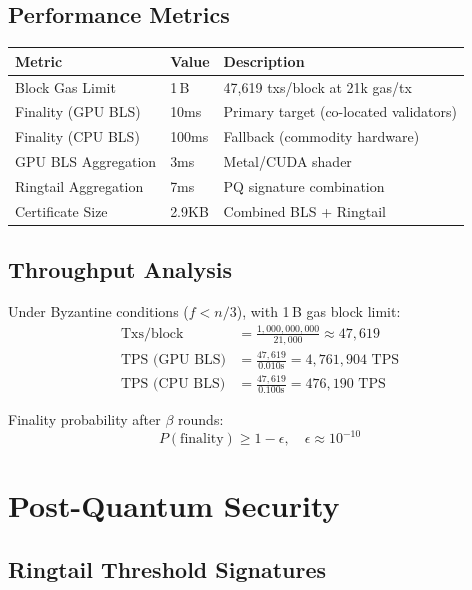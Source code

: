 \documentclass[11pt]{article}
\begin{document}
\subsection{Performance Metrics}

\begin{table}[h]
\centering
\begin{tabular}{@{}lll@{}}
\toprule
\textbf{Metric} & \textbf{Value} & \textbf{Description} \\
\midrule
Block Gas Limit & 1\,B & 47{,}619 txs/block at 21k gas/tx \\
Finality (GPU BLS) & 10ms & Primary target (co-located validators) \\
Finality (CPU BLS) & 100ms & Fallback (commodity hardware) \\
GPU BLS Aggregation & 3ms & Metal/CUDA shader \\
Ringtail Aggregation & 7ms & PQ signature combination \\
Certificate Size & 2.9KB & Combined BLS + Ringtail \\
\bottomrule
\end{tabular}

\label{tab:performance}
\end{table}

\subsection{Throughput Analysis}

Under Byzantine conditions ($f < n/3$), with 1\,B gas block limit:
\begin{align}
\text{Txs/block} &= \frac{1{,}000{,}000{,}000}{21{,}000} \approx 47{,}619 \\
\text{TPS (GPU BLS)} &= \frac{47{,}619}{0.010\text{s}} = 4{,}761{,}904 \text{ TPS} \\
\text{TPS (CPU BLS)} &= \frac{47{,}619}{0.100\text{s}} = 476{,}190 \text{ TPS}
\end{align}

Finality probability after $\beta$ rounds:
\begin{equation}
P(\text{finality}) \geq 1 - \epsilon, \quad \epsilon \approx 10^{-10}
\end{equation}

\section{Post-Quantum Security}

\subsection{Ringtail Threshold Signatures}
\end{document}
